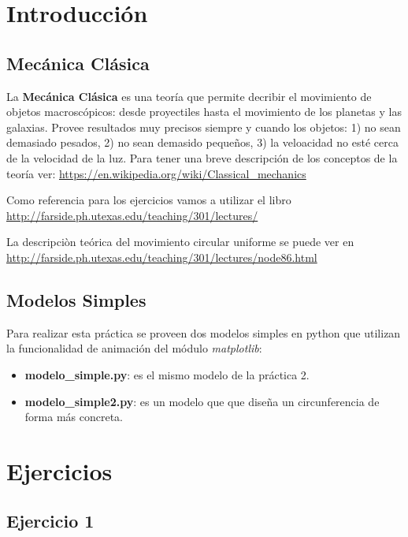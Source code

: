 \documentclass[a4paper]{article}
\begin{document}

\section{Introducción}

\subsection{Mecánica Clásica}

La \textbf{Mecánica Clásica} es una teoría que permite decribir el 
movimiento de objetos macroscópicos: desde proyectiles hasta el 
movimiento de los planetas y las galaxias. Provee resultados muy 
precisos siempre y cuando los objetos: 1) no sean demasiado pesados, 2) 
no sean demasido pequeños, 3) la veloacidad no esté cerca de la 
velocidad de la luz. Para tener una breve descripción de los conceptos 
de la teoría ver: \url{https://en.wikipedia.org/wiki/Classical_mechanics}

\bigskip

Como referencia para los ejercicios vamos a utilizar el libro \url{http://farside.ph.utexas.edu/teaching/301/lectures/}

\bigskip

La descripciòn teórica del movimiento circular uniforme se puede ver en \url{http://farside.ph.utexas.edu/teaching/301/lectures/node86.html}

\subsection{Modelos Simples}

Para realizar esta práctica se proveen dos modelos simples en python 
que utilizan la funcionalidad de animación del módulo 
\emph{matplotlib}:

\begin{itemize}
	\item \textbf{modelo\_simple.py}: es el mismo modelo de la práctica 2. 
	\item \textbf{modelo\_simple2.py}: es un modelo que que diseña un 
	circunferencia de forma más concreta. 
\end{itemize}


\section{Ejercicios}

\subsection{Ejercicio 1}
\end{document}
